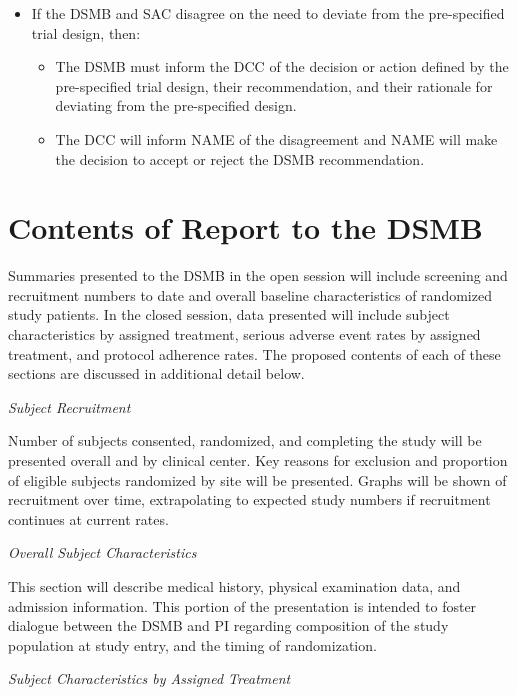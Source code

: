\documentclass[12pt]{article}
\begin{document}
\begin{itemize}
\begin{itemize}
\item If the DSMB and SAC disagree on the need to deviate from the pre-specified trial design, then:
\begin{itemize}
\item The DSMB must inform the DCC of the decision or action defined by the pre-specified trial design, their recommendation, and their rationale for deviating from the pre-specified design.
\item The DCC will inform NAME of the disagreement and NAME will make the decision to accept or reject the DSMB recommendation.
\end{itemize} 
\end{itemize}
\end{itemize}


\section{Contents of Report to the DSMB}
Summaries presented to the DSMB in the open session will include screening 
and recruitment numbers to date and overall baseline characteristics of 
randomized study patients. In the closed session, data presented will 
include subject characteristics by assigned treatment, serious adverse event 
rates by assigned treatment, and protocol adherence rates. The proposed 
contents of each of these sections are discussed in additional detail below.

\vspace{0.4cm}
\noindent \textit{Subject Recruitment}

Number of subjects consented, randomized, and completing the study will be 
presented overall and by clinical center. Key reasons for exclusion and 
proportion of eligible subjects randomized by site will be presented. Graphs 
will be shown of recruitment over time, extrapolating to expected study 
numbers if recruitment continues at current rates.

\vspace{0.4cm}
\noindent \textit{Overall Subject Characteristics}

This section will describe medical history, physical examination data, and 
admission information.
This portion of the presentation is intended to foster dialogue between the 
DSMB and PI regarding composition of the study population at study entry, 
and the timing of randomization.

\vspace{0.4cm}
\noindent \textit{Subject Characteristics by Assigned Treatment}
\end{document}
